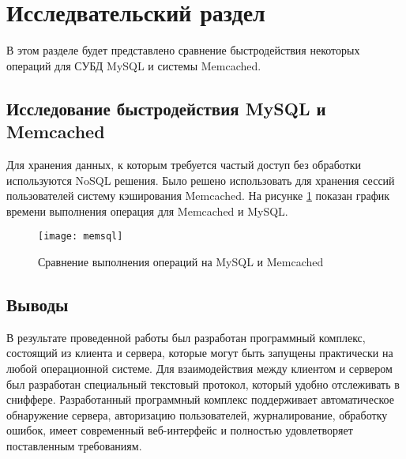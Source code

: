 \section{Исследвательский раздел}
В этом разделе будет представлено сравнение быстродействия
некоторых операций для СУБД MySQL и системы Memcached.

\subsection{Исследование быстродействия MySQL и Memcached}
Для хранения данных, к которым требуется частый доступ без обработки
используются NoSQL решения. Было решено использовать для хранения
сессий пользователей систему кэширования Memcached. На рисунке \ref{memsql}
показан график времени выполнения операция для Memcached и MySQL.

\begin{figure}[!hbt]
    \centering
    \texttt{[image: memsql]}
    \caption{Сравнение выполнения операций на MySQL и Memcached}\label{memsql}
\end{figure}

\subsection*{Выводы}
В результате проведенной работы был разработан программный
комплекс, состоящий из клиента и сервера, которые могут быть запущены
практически на любой операционной системе.
\newpar
Для взаимодействия между
клиентом и сервером был разработан специальный текстовый протокол,
который удобно отслеживать в сниффере. Разработанный программный
комплекс поддерживает автоматическое обнаружение сервера, авторизацию
пользователей, журналирование, обработку ошибок, имеет современный веб-интерфейс
и полностью удовлетворяет поставленным требованиям.

